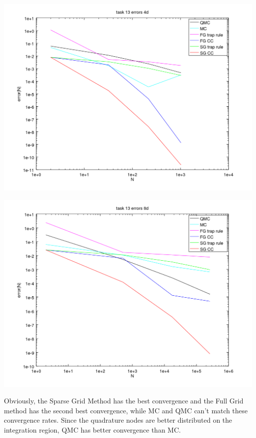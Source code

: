 \documentclass[10pt,a4paper]{article}
\begin{document}
\begin{center}
\includegraphics[scale=0.5]{task_13_d4.png}
\end{center}
\begin{center}
\includegraphics[scale=0.5]{task_13_d8.png}
\end{center}
Obviously, the Sparse Grid Method has the best convergence and the Full
Grid method has the second best convergence, while MC and QMC can't match
these convergence rates. Since the quadrature nodes are better distributed on
the integration region, QMC has better convergence than MC.
\end{document}
